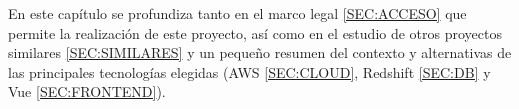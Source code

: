 
En este capítulo se profundiza tanto en el marco legal \ref{SEC:ACCESO} que permite la realización de este proyecto, así como en el estudio de otros proyectos similares \ref{SEC:SIMILARES} y un pequeño resumen del contexto y alternativas de las principales tecnologías elegidas (AWS \ref{SEC:CLOUD}, Redshift \ref{SEC:DB} y Vue \ref{SEC:FRONTEND}).
